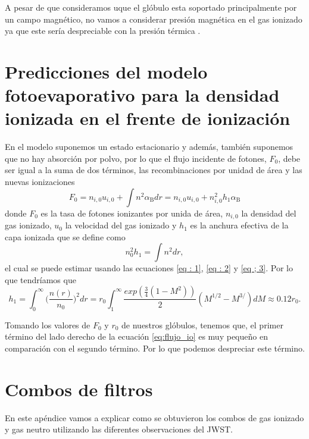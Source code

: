 \documentclass{book}
\begin{document}
A pesar de que consideramos uque el glóbulo esta soportado principalmente por un campo magnético, no vamos a considerar presión magnética en el gas ionizado ya que este sería despreciable con la presión térmica \citep{Will:2009}.

\chapter{Predicciones del modelo fotoevaporativo para la densidad ionizada en el frente de ionización }\label{App : tasa de fotoionizacion}

En el modelo suponemos un estado estacionario y además, también suponemos que no hay absorción por polvo, por lo que el flujo incidente de fotones, $F_0$, debe ser igual a la suma de dos términos, las recombinaciones por unidad de área y las nuevas ionizaciones
\begin{equation}\label{eq:flujo_io}
F_0 = n_{i,0} u_{i,0} +\int n^2\alpha_\mathrm{B}dr = n_{i,0}u_{i,0}+n_{i,0}^2h_1\alpha_\mathrm{B}
\end{equation}
donde $F_0$ es la tasa de fotones ionizantes por unida de área, $n_{i,0}$ la densidad del gas ionizado, $u_0$ la velocidad del gas ionizado y $h_1$ es la anchura efectiva de la capa ionizada que se define como
\begin{equation}
n_0^2h_1=\int n^2dr,
\end{equation}
el cual se puede estimar usando las ecuaciones  \ref{eq : 1}, \ref{eq : 2} y \ref{eq ; 3}. Por lo que tendríamos que 
\begin{equation}
h_1=\int_0^\infty \Big(\frac{n(r)}{n_0}\Big)^2dr=r_0\int_1^\infty\frac{exp(\frac{3}{4}(1-M^2))}{2}(M^{1/2}-M^{3/})dM\approx0.12r_0.\end{equation}

Tomando los valores de $F_0$ y $r_0$ de nuestros glóbulos, tenemos que, el primer término del lado derecho de la ecuación \ref{eq:flujo_io} es muy pequeño en comparación con el segundo término. Por lo que podemos despreciar este término.

\chapter{Combos de filtros}\label{AP: combos}

En este apéndice vamos a explicar como se obtuvieron los combos de gas ionizado y gas neutro utilizando las diferentes observaciones del JWST. 
\end{document}
